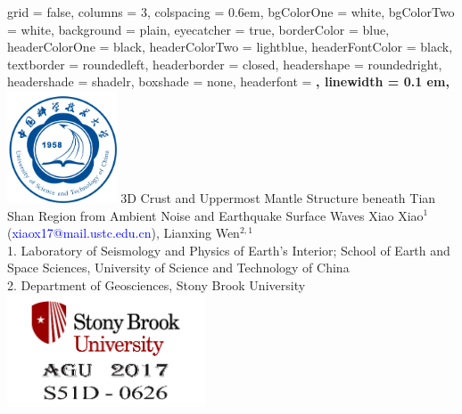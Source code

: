 \documentclass[
    landscape,      %
    paperwidth = 1120mm,
    paperheight = 820mm,
    fontscale = 0.45,
    margin = 1.7cm,
]{baposter}
\begin{document}
\begin{poster}{
    grid = false,            %
    columns = 3,
    colspacing = 0.6em,
    bgColorOne = white,
    bgColorTwo = white,
    background = plain,     %
    eyecatcher = true,      %
    borderColor = blue,
    headerColorOne = black,
    headerColorTwo = lightblue,
    headerFontColor = black,
    textborder = roundedleft,   %
    headerborder = closed,      %
    headershape = roundedright, %
    headershade = shadelr,      %
    boxshade = none,            %
    headerfont = \Large\bf\textsc,
    linewidth = 0.1 em,}
{\includegraphics[height=9em]{./images/USTC_logo_blue.jpg}}
{\Huge{3D Crust and Uppermost Mantle Structure beneath Tian Shan Region from Ambient Noise and Earthquake Surface Waves}}
{
    \vspace{0.3em}
    Xiao Xiao$^1$ (\textcolor{blue}{xiaox17@mail.ustc.edu.cn}),
    Lianxing Wen$^{2,1}$ \\
    \vspace{0.3em}
    1. Laboratory of Seismology and Physics of Earth's Interior; School of Earth and Space Sciences, University of Science and Technology of China  \\
    2. Department of Geosciences, Stony Brook University  \\
}
{\includegraphics[height=9em]{./images/Righthand.png}}
\vspace{0.4cm}


\end{poster}
\end{document}
